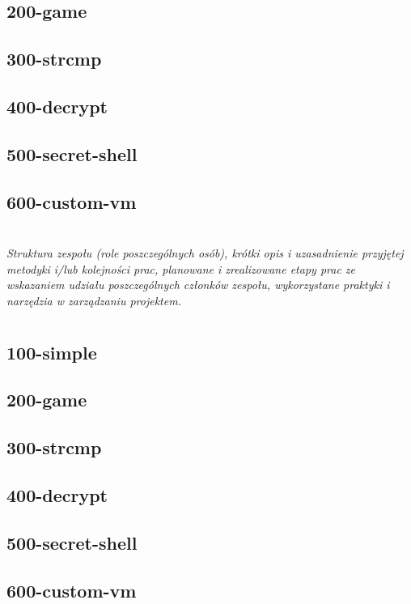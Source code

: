 \documentclass[polish,12pt]{aghthesis}
\begin{document}
\subsection{200-game}

\subsection{300-strcmp}

\subsection{400-decrypt}

\subsection{500-secret-shell}

\subsection{600-custom-vm}

\clearpage

\section{\SectionTitleWorkOrganization}
\label{sec:organizacja-pracy}
\emph{Struktura zespołu (role poszczególnych osób), krótki opis i
    uzasadnienie przyjętej metodyki i/lub kolejności prac, planowane i
    zrealizowane etapy prac ze wskazaniem udziału poszczególnych
    członków zespołu, wykorzystane praktyki i narzędzia w zarządzaniu
    projektem.}

\clearpage

\section{\SectionTitleResults}
\label{sec:wyniki-projektu}

\subsection{100-simple}

\subsection{200-game}

\subsection{300-strcmp}

\subsection{400-decrypt}

\subsection{500-secret-shell}

\subsection{600-custom-vm}

\clearpage


\end{document}
